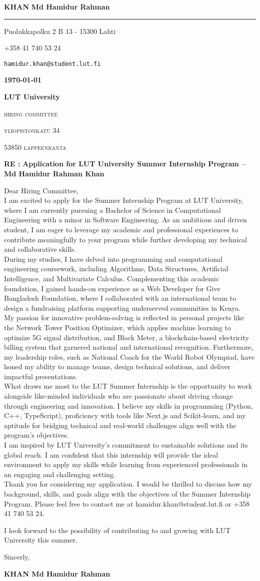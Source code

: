 \documentclass[12pt]{article}
\newcommand{\firstname}{Md Hamidur Rahman}
\newcommand{\lastname}{Khan}
\newcommand{\mainColor}{redBlood} %
\newlength{\spacebox}
\newcommand{\shspace}{\hspace*{0.8em}}
\newcommand{\xvspace}{\vspace*{0.1em}}
\newcommand{\svspace}{\vspace*{0.5em}}
\newcommand{\mvspace}{\vspace*{1.5em}}
\newcommand{\hvspace}{\vspace*{2.5em}}
\newcommand{\negmvspace}{\vspace*{-1em}}
\newcommand{\userInfo}[4]{
    \begin{flushleft}
        \color{\mainColor}
        \Huge
        \textbf{\MakeUppercase{\lastname}}
        \color{black}
        \textbf{\firstname}
        \color{\mainColor}
        \noindent\rule{19.1cm}{0.8pt}
        \color{grayShy}
        \small
        \par
        \parbox{7\spacebox} {
            \faMap \shspace #1 - #2 \par \svspace
            \faPhone \shspace #3 \par \svspace
            \faEnvelopeOpen \shspace \texttt{#4} \par \svspace
        }
        \color{\mainColor}
        \mvspace
    \end{flushleft}
    \negmvspace
}
\newcommand{\companyInfo}[4]{
    \begin{flushright}
        \parbox{4\spacebox}{
            \raggedleft
            \small
            \textbf{\today}\par
            \xvspace
            \textbf{#1}\par
            \mvspace
            \color{grayShy} \textsc{\MakeLowercase{#2}}\par
            \xvspace
            \textsc{\MakeLowercase{#3}}\par
            \xvspace
            \textsc{\MakeLowercase{#4}}\par 
            \color{black}
        }
    \end{flushright} 
    \hvspace
}
\newcommand{\object}[1]{
    \small
    \color{\mainColor} \textbf{RE :} \color{black} \textbf{#1} \par
}
\newcommand{\content}[2]{
    \mvspace
    \begin{flushleft}
        \parbox{10.3\spacebox}{
          #1\par
          \svspace
          #2
        }\par
    \end{flushleft}
}
\newcommand{\signature}{
    \svspace
    \parbox{3\spacebox}{
      Sincerly,\par
      \svspace \hspace{-0.3em}
      \textbf{\color{\mainColor} \MakeUppercase{\lastname} \color{black} \firstname}\par
      \svspace \svspace
    }\par
}
\begin{document}
\selectfont
\userInfo{Puolukkapolku 2 B 13}{15300 Lahti}{+358 41 740 53 24}{hamidur.khan@student.lut.fi}
\companyInfo{LUT University}{Hiring Committee}{Yliopistonkatu 34}{53850 Lappeenranta}
\object{Application for LUT University Summer Internship Program – Md Hamidur Rahman Khan}
\content{
  Dear Hiring Committee, \\
  
  I am excited to apply for the Summer Internship Program at LUT University, where I am currently pursuing a Bachelor of Science in Computational Engineering with a minor in Software Engineering. As an ambitious and driven student, I am eager to leverage my academic and professional experiences to contribute meaningfully to your program while further developing my technical and collaborative skills. \\

  During my studies, I have delved into programming and computational engineering coursework, including Algorithms, Data Structures, Artificial Intelligence, and Multivariate Calculus. Complementing this academic foundation, I gained hands-on experience as a Web Developer for Give Bangladesh Foundation, where I collaborated with an international team to design a fundraising platform supporting underserved communities in Kenya. \\

  My passion for innovative problem-solving is reflected in personal projects like the Network Tower Position Optimizer, which applies machine learning to optimize 5G signal distribution, and Block Meter, a blockchain-based electricity billing system that garnered national and international recognition. Furthermore, my leadership roles, such as National Coach for the World Robot Olympiad, have honed my ability to manage teams, design technical solutions, and deliver impactful presentations. \\
  
  What draws me most to the LUT Summer Internship is the opportunity to work alongside like-minded individuals who are passionate about driving change through engineering and innovation. I believe my skills in programming (Python, C++, TypeScript), proficiency with tools like Next.js and Scikit-learn, and my aptitude for bridging technical and real-world challenges align well with the program's objectives. \\
  
  I am inspired by LUT University’s commitment to sustainable solutions and its global reach. I am confident that this internship will provide the ideal environment to apply my skills while learning from experienced professionals in an engaging and challenging setting. \\
  
  Thank you for considering my application. I would be thrilled to discuss how my background, skills, and goals align with the objectives of the Summer Internship Program. Please feel free to contact me at hamidur.khan@student.lut.fi or +358 41 740 53 24. \\

}{I look forward to the possibility of contributing to and growing with LUT University this summer.}
\signature
\end{document}
